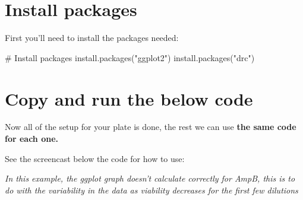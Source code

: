 \documentclass[
  letterpaper,
  DIV=11,
  numbers=noendperiod]{scrreprt}
\newenvironment{Shaded}{\begin{snugshade}}{\end{snugshade}}
\newcommand{\CommentTok}[1]{\textcolor[rgb]{0.37,0.37,0.37}{#1}}
\newcommand{\FunctionTok}[1]{\textcolor[rgb]{0.28,0.35,0.67}{#1}}
\newcommand{\NormalTok}[1]{\textcolor[rgb]{0.00,0.23,0.31}{#1}}
\newcommand{\StringTok}[1]{\textcolor[rgb]{0.13,0.47,0.30}{#1}}
\begin{document}
\section{Install packages}\label{install-packages}

First you'll need to install the packages needed:

\begin{Shaded}
\begin{Highlighting}[]
\CommentTok{\# Install packages}
\FunctionTok{install.packages}\NormalTok{(}\StringTok{"ggplot2"}\NormalTok{)}
\FunctionTok{install.packages}\NormalTok{(}\StringTok{"drc"}\NormalTok{)}
\end{Highlighting}
\end{Shaded}

\section{Copy and run the below code}\label{copy-and-run-the-below-code}

Now all of the setup for your plate is done, the rest we can use
\textbf{the same code for each one.}

See the screencast below the code for how to use:

\emph{In this example, the ggplot graph doesn't calculate correctly for
AmpB, this is to do with the variability in the data as viability
decreases for the first few dilutions}
\end{document}
